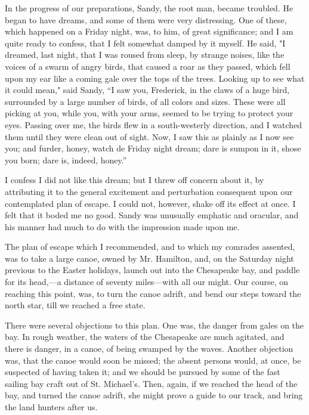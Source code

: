 In the progress of our preparations, Sandy, the root man, became
troubled. He began to have dreams, and some of them were very
distressing. One of these, which happened on a Friday night, was, to
him, of great significance; and I am quite ready to confess, that I felt
somewhat damped by it myself. He said, "I dreamed, last night, that I
was roused from sleep, by strange noises, like the voices of a swarm of
angry birds, that caused a roar as they passed, which fell
{\protect\hypertarget{285}{}{}}upon my ear like a coming gale over the
tops of the trees. Looking up to see what it could mean," said Sandy,
``I saw you, Frederick, in the claws of a huge bird, surrounded by a
large number of birds, of all colors and sizes. These were all picking
at you, while you, with your arms, seemed to be trying to protect your
eyes. Passing over me, the birds flew in a south-westerly direction, and
I watched them until they were clean out of sight. Now, I saw this as
plainly as I now see you; and furder, honey, watch de Friday night
dream; dare is sumpon in it, shose you born; dare is, indeed, honey.''

I confess I did not like this dream; but I threw off concern about it,
by attributing it to the general excitement and perturbation consequent
upon our contemplated plan of escape. I could not, however, shake off
its effect at once. I felt that it boded me no good. Sandy was unusually
emphatic and oracular, and his manner had much to do with the impression
made upon me.

The plan of escape which I recommended, and to which my comrades
assented, was to take a large canoe, owned by Mr. Hamilton, and, on the
Saturday night previous to the Easter holidays, launch out into the
Chesapeake bay, and paddle for its head,---a distance of seventy
miles---with all our might. Our course, on reaching this point, was, to
turn the canoe adrift, and bend our steps toward the north star, till we
reached a free state.

There were several objections to this plan. One was, the danger from
gales on the bay. In rough weather, the waters of the Chesapeake are
much {\protect\hypertarget{286}{}{}}agitated, and there is danger, in a
canoe, of being swamped by the waves. Another objection was, that the
canoe would soon be missed; the absent persons would, at once, be
suspected of having taken it; and we should be pursued by some of the
fast sailing bay craft out of St. Michael's. Then, again, if we reached
the head of the bay, and turned the canoe adrift, she might prove a
guide to our track, and bring the land hunters after us.

